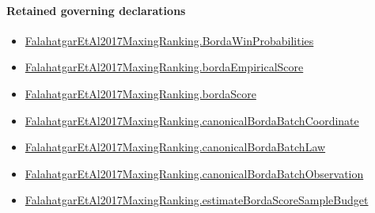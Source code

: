 \documentclass[10pt]{article}
\begin{document}
\paragraph{Retained governing declarations}
\begin{itemize}\raggedright
\item \hyperlink{paper-prerequisite-5ac1483a89567450}{Falahatgar\allowbreak{}Et\allowbreak{}Al2017\allowbreak{}Maxing\allowbreak{}Ranking.\allowbreak{}Borda\allowbreak{}Win\allowbreak{}Probabilities}
\item \hyperlink{paper-prerequisite-2a72291ebc16ccb3}{Falahatgar\allowbreak{}Et\allowbreak{}Al2017\allowbreak{}Maxing\allowbreak{}Ranking.\allowbreak{}borda\allowbreak{}Empirical\allowbreak{}Score}
\item \hyperlink{paper-prerequisite-671eb60c445d7522}{Falahatgar\allowbreak{}Et\allowbreak{}Al2017\allowbreak{}Maxing\allowbreak{}Ranking.\allowbreak{}borda\allowbreak{}Score}
\item \hyperlink{governing-declaration-8edb67932b6e00e4}{Falahatgar\allowbreak{}Et\allowbreak{}Al2017\allowbreak{}Maxing\allowbreak{}Ranking.\allowbreak{}canonical\allowbreak{}Borda\allowbreak{}Batch\allowbreak{}Coordinate}
\item \hyperlink{governing-declaration-bc3edfccbf4be274}{Falahatgar\allowbreak{}Et\allowbreak{}Al2017\allowbreak{}Maxing\allowbreak{}Ranking.\allowbreak{}canonical\allowbreak{}Borda\allowbreak{}Batch\allowbreak{}Law}
\item \hyperlink{governing-declaration-68260ae3aff5e5e0}{Falahatgar\allowbreak{}Et\allowbreak{}Al2017\allowbreak{}Maxing\allowbreak{}Ranking.\allowbreak{}canonical\allowbreak{}Borda\allowbreak{}Batch\allowbreak{}Observation}
\item \hyperlink{paper-prerequisite-97e9bef8b2d861bf}{Falahatgar\allowbreak{}Et\allowbreak{}Al2017\allowbreak{}Maxing\allowbreak{}Ranking.\allowbreak{}estimate\allowbreak{}Borda\allowbreak{}Score\allowbreak{}Sample\allowbreak{}Budget}
\end{itemize}
\end{document}
